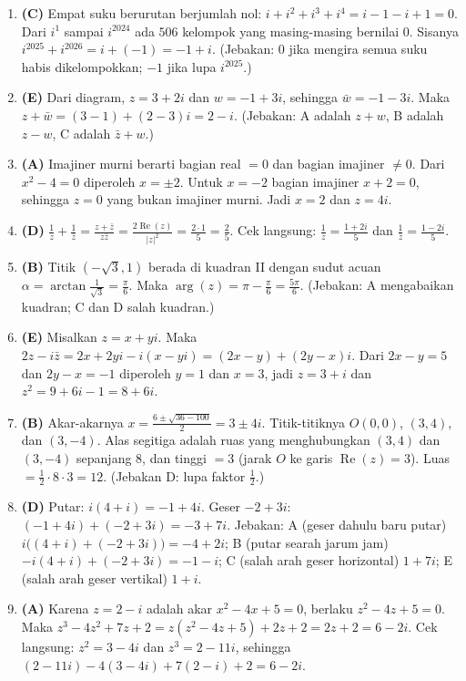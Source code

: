 \documentclass[a4paper,11pt]{article}
\newcommand{\dis}{\displaystyle}
\renewcommand{\Re}{\operatorname{Re}}
\newcounter{no}
\begin{document}
\small\begin{enumerate}[leftmargin=2em,itemsep=2pt,topsep=2pt]
\item[\textbf{1.}] \textbf{(C)} Empat suku berurutan berjumlah nol: $i+i^2+i^3+i^4=i-1-i+1=0$. Dari $i^1$ sampai $i^{2024}$ ada $506$ kelompok yang masing-masing bernilai $0$. Sisanya $i^{2025}+i^{2026}=i+(-1)=-1+i$. (Jebakan: $0$ jika mengira semua suku habis dikelompokkan; $-1$ jika lupa $i^{2025}$.)
\item[\textbf{2.}] \textbf{(E)} Dari diagram, $z=3+2i$ dan $w=-1+3i$, sehingga $\bar w=-1-3i$. Maka $z+\bar w=(3-1)+(2-3)i=2-i$. (Jebakan: A adalah $z+w$, B adalah $z-w$, C adalah $\bar z+w$.)
\item[\textbf{3.}] \textbf{(A)} Imajiner murni berarti bagian real $=0$ dan bagian imajiner $\neq0$. Dari $x^2-4=0$ diperoleh $x=\pm2$. Untuk $x=-2$ bagian imajiner $x+2=0$, sehingga $z=0$ yang bukan imajiner murni. Jadi $x=2$ dan $z=4i$.
\item[\textbf{4.}] \textbf{(D)} $\dis\frac1z+\frac1{\bar z}=\frac{z+\bar z}{z\bar z}=\frac{2\Re(z)}{|z|^2}=\frac{2\cdot1}{5}=\frac25$. Cek langsung: $\frac1z=\frac{1+2i}{5}$ dan $\frac1{\bar z}=\frac{1-2i}{5}$.
\item[\textbf{5.}] \textbf{(B)} Titik $(-\sqrt3,1)$ berada di kuadran II dengan sudut acuan $\alpha=\arctan\dis\frac{1}{\sqrt3}=\frac\pi6$. Maka $\arg(z)=\pi-\frac\pi6=\frac{5\pi}6$. (Jebakan: A mengabaikan kuadran; C dan D salah kuadran.)
\item[\textbf{6.}] \textbf{(E)} Misalkan $z=x+yi$. Maka $2z-i\bar z=2x+2yi-i(x-yi)=(2x-y)+(2y-x)i$. Dari $2x-y=5$ dan $2y-x=-1$ diperoleh $y=1$ dan $x=3$, jadi $z=3+i$ dan $z^2=9+6i-1=8+6i$.
\item[\textbf{7.}] \textbf{(B)} Akar-akarnya $x=\dis\frac{6\pm\sqrt{36-100}}{2}=3\pm4i$. Titik-titiknya $O(0,0)$, $(3,4)$, dan $(3,-4)$. Alas segitiga adalah ruas yang menghubungkan $(3,4)$ dan $(3,-4)$ sepanjang $8$, dan tinggi $=3$ (jarak $O$ ke garis $\Re(z)=3$). Luas $=\frac12\cdot8\cdot3=12$. (Jebakan D: lupa faktor $\frac12$.)
\item[\textbf{8.}] \textbf{(D)} Putar: $i(4+i)=-1+4i$. Geser $-2+3i$: $(-1+4i)+(-2+3i)=-3+7i$. Jebakan: A (geser dahulu baru putar) $i\big((4+i)+(-2+3i)\big)=-4+2i$; B (putar searah jarum jam) $-i(4+i)+(-2+3i)=-1-i$; C (salah arah geser horizontal) $1+7i$; E (salah arah geser vertikal) $1+i$.
\item[\textbf{9.}] \textbf{(A)} Karena $z=2-i$ adalah akar $x^2-4x+5=0$, berlaku $z^2-4z+5=0$. Maka $z^3-4z^2+7z+2=z(z^2-4z+5)+2z+2=2z+2=6-2i$. Cek langsung: $z^2=3-4i$ dan $z^3=2-11i$, sehingga $(2-11i)-4(3-4i)+7(2-i)+2=6-2i$.

\end{enumerate}
\end{document}
